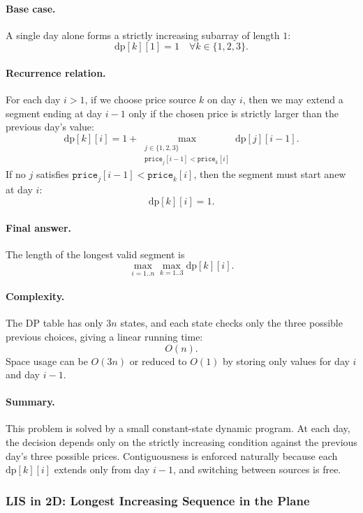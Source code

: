 \documentclass[9pt]{extarticle}
\begin{document}
\paragraph{Base case.}
A single day alone forms a strictly increasing subarray of length $1$:
\[
\mathrm{dp}[k][1] = 1
\quad\forall k \in \{1,2,3\}.
\]

\paragraph{Recurrence relation.}
For each day $i > 1$, if we choose price source $k$ on day $i$, then we may extend
a segment ending at day $i-1$ only if the chosen price is strictly larger than the
previous day's value:
\[
\mathrm{dp}[k][i]
= 1 + 
\max_{\substack{j \in \{1,2,3\} \\ \texttt{price}_j[i-1] < \texttt{price}_k[i]}}
\mathrm{dp}[j][i-1].
\]
If no $j$ satisfies $\texttt{price}_j[i-1] < \texttt{price}_k[i]$, then the segment
must start anew at day $i$:
\[
\mathrm{dp}[k][i] = 1.
\]

\paragraph{Final answer.}
The length of the longest valid segment is
\[
\max_{i=1..n} \max_{k=1..3} \mathrm{dp}[k][i].
\]

\paragraph{Complexity.}
The DP table has only $3n$ states, and each state checks only the three possible
previous choices, giving a linear running time:
\[
O(n).
\]
Space usage can be $O(3n)$ or reduced to $O(1)$ by storing only values for day $i$
and day $i-1$.

\paragraph{Summary.}
This problem is solved by a small constant-state dynamic program.  
At each day, the decision depends only on the strictly increasing condition
against the previous day’s three possible prices.  
Contiguousness is enforced naturally because each $\mathrm{dp}[k][i]$ extends only
from day $i-1$, and switching between sources is free.

\subsubsection{LIS in 2D: Longest Increasing Sequence in the Plane}
\end{document}
